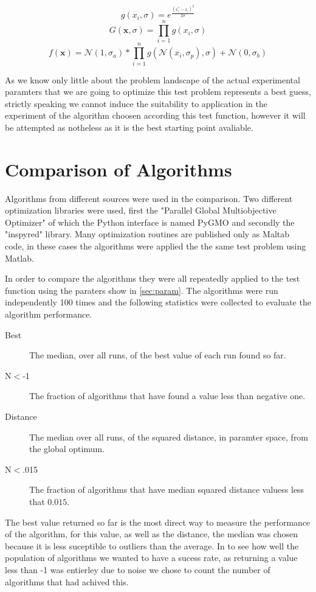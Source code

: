 \documentclass[a4paper,titlepage]{report}
\begin{document}
\[g(x_i,\sigma) = e^{\frac{(x_i^*-x_i)^2}{2\sigma}}\]
\[G(\mathbf{x},\sigma) = \prod_{i=1}^n g(x_i, \sigma)\]
\[f(\mathbf{x}) =  \mathcal{N}(1,\sigma_a) * \prod_{i=1}^n g(\mathcal{N}(x_i,\sigma_p), \sigma) + \mathcal{N}(0,\sigma_b) \]

As we know only little about the problem landscape of the actual experimental paramters that we are going to optimize this test problem represents a best guess, strictly speaking we cannot induce the suitability to application in the experiment of the algorithm choosen according this test function, however it will be attempted as notheless as it is the best starting point avaliable.


\section{Comparison of Algorithms}

Algorithms from different sources were used in the comparison. Two different optimization libraries were used, first the  "Parallel Global Multiobjective Optimizer"\cite{pygmo} of which the Python interface is named PyGMO and secondly the "inspyred"\cite{inspyred} library. Many optimization routines are published only as Maltab code, in these cases the algorithms were applied the the same test problem using Matlab.

In order to compare the algorithms they were all repeatedly applied to the test function using the paraters show in \ref{sec:param}. The algorithms were run independently 100 times and the following statistics were collected to evaluate the algorithm performance.

\begin{description}
\item[Best] The median, over all runs, of the best value of each run found so far.
\item[N$<$-1] The fraction of algorithms that have found a value less than negative one.
\item[Distance] The median over all runs, of the squared distance, in paramter space,  from the global optimum.
\item[N$<$.015] The fraction of algorithms that have median squared distance valuess less that $0.015$.
\end{description}

The best value returned so far is the most direct way to measure the performance of the algorithm, for this value, as well as the distance, the median was chosen because it is less suceptible to outliers than the average. In to see how well the population of algorithms we wanted to have a sucess rate, as returning a value less than -1 was entierley due to noise we chose to count the number of algorithms that had achived this.
\end{document}
